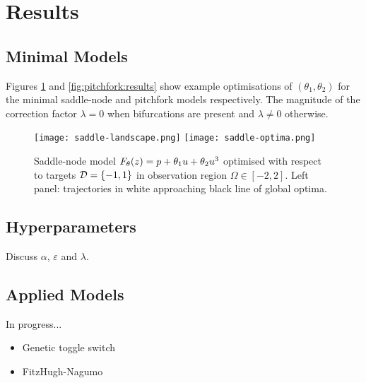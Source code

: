 \section{Results}

\subsection{Minimal Models}
Figures \ref{fig:saddle-node:results} and \ref{fig:pitchfork:results} show example optimisations of $(\theta_1,\theta_2)$ for the minimal saddle-node and pitchfork models respectively. The magnitude of the correction factor $\lambda=0$ when bifurcations are present and $\lambda\neq0$ otherwise.

\begin{figure}[H]
\centering{}
\captionsetup{justification=centering}
\texttt{[image: saddle-landscape.png]}
\texttt{[image: saddle-optima.png]}
\caption{Saddle-node model $F_{\theta}(z) = p + \theta_{1}u+\theta_{2}u^3$ optimised with respect to targets $\mathcal{D}=\{-1,1\}$ in observation region $\Omega\in[-2,2]$. Left panel: trajectories in white approaching black line of global optima.}
\label{fig:saddle-node:results}
\end{figure}

\subsection{Hyperparameters}
Discuss $\alpha$, $\varepsilon$ and $\lambda$.

\subsection{Applied Models}
In progress...
\begin{itemize}
    \item Genetic toggle switch
    \item FitzHugh-Nagumo
\end{itemize}


